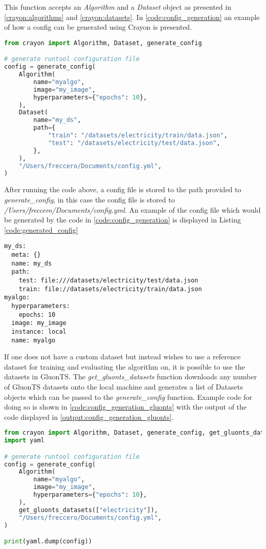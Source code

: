 This function accepts an \textit{Algorithm} and a \textit{Dataset} object as presented in \ref{crayon:algorithms} and \ref{crayon:datasets}. In \ref{code:config_generation} an example of how a config can be generated using Crayon is presented.
\\
\begin{lstlisting}[language=Python, label={code:config_generation}, caption=Config generation using Crayon]
from crayon import Algorithm, Dataset, generate_config

# generate runtool configuration file
config = generate_config(
    Algorithm(
        name="myalgo",
        image="my_image",
        hyperparameters={"epochs": 10},
    ),
    Dataset(
        name="my_ds",
        path={
            "train": "/datasets/electricity/train/data.json",
            "test": "/datasets/electricity/test/data.json",
        },
    ),
    "/Users/freccero/Documents/config.yml",
)
\end{lstlisting}

After running the code above, a config file is stored to the path provided to \textit{generate\_config}, in this case the config file is stored to \textit{/Users/freccero/Documents/config.yml}. An example of the config file which would be generated by the code in \ref{code:config_generation} is displayed in Listing \ref{code:generated_config}
\\
\begin{lstlisting}[label={code:generated_config}, caption=Generated configurations file.]
my_ds:
  meta: {}
  name: my_ds
  path:
    test: file:///datasets/electricity/test/data.json
    train: file://datasets/electricity/train/data.json
myalgo:
  hyperparameters:
    epochs: 10
  image: my_image
  instance: local
  name: myalgo
\end{lstlisting}

If one does not have a custom dataset but instead wishes to use a reference dataset for training and evaluating the algorithm on, it is possible to use the datasets in GluonTS. The \textit{get\_gluonts\_datasets} function downloads any number of GluonTS datasets onto the local machine and generates a list of Datasets objects which can be passed to the  \textit{generate\_config} function. Example code for doing so is shown in \ref{code:config_generation_gluonts} with the output of the code displayed in \ref{output:config_generation_gluonts}.

\begin{lstlisting}[language=Python, label={code:config_generation_gluonts}, caption=Config generation using Crayon with gluonts datasets]
from crayon import Algorithm, Dataset, generate_config, get_gluonts_datasets
import yaml

# generate runtool configuration file
config = generate_config(
    Algorithm(
        name="myalgo",
        image="my_image",
        hyperparameters={"epochs": 10},
    ),
    get_gluonts_datasets(["electricity"]),
    "/Users/freccero/Documents/config.yml",
)

print(yaml.dump(config))
\end{lstlisting}

